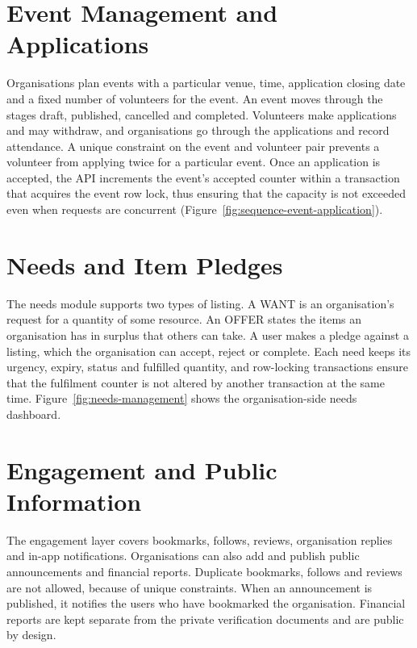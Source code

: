 \section{Event Management and Applications}
\label{sec:impl-events}
Organisations plan events with a particular venue, time, application closing date and a fixed number of volunteers for the event. An event moves through the stages draft, published, cancelled and completed. Volunteers make applications and may withdraw, and organisations go through the applications and record attendance. A unique constraint on the event and volunteer pair prevents a volunteer from applying twice for a particular event. Once an application is accepted, the API increments the event's accepted counter within a transaction that acquires the event row lock, thus ensuring that the capacity is not exceeded even when requests are concurrent (Figure~\ref{fig:sequence-event-application}).


\section{Needs and Item Pledges}
\label{sec:impl-needs}
The needs module supports two types of listing. A WANT is an organisation's request for a quantity of some resource. An OFFER states the items an organisation has in surplus that others can take. A user makes a pledge against a listing, which the organisation can accept, reject or complete. Each need keeps its urgency, expiry, status and fulfilled quantity, and row-locking transactions ensure that the fulfilment counter is not altered by another transaction at the same time. Figure~\ref{fig:needs-management} shows the organisation-side needs dashboard.

\section{Engagement and Public Information}
\label{sec:impl-engagement}
The engagement layer covers bookmarks, follows, reviews, organisation replies and in-app notifications. Organisations can also add and publish public announcements and financial reports. Duplicate bookmarks, follows and reviews are not allowed, because of unique constraints. When an announcement is published, it notifies the users who have bookmarked the organisation. Financial reports are kept separate from the private verification documents and are public by design.


